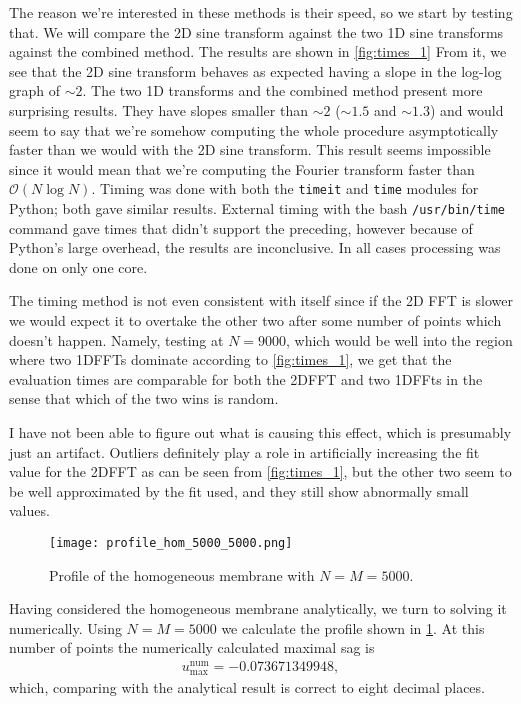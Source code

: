 \documentclass[10pt,a4paper,twocolumn]{article}
\begin{document}
The reason we're interested in these methods is their speed, so we start by testing that. We will compare the 2D sine transform against the two 1D sine transforms against the combined method. The results are shown in \cref{fig:times_1} From it, we see that the 2D sine transform behaves as expected having a slope in the log-log graph of $\sim\!2$. The two 1D transforms and the combined method present more surprising results. They have slopes smaller than $\sim\!2$ ($\sim\!1.5$ and $\sim\!1.3$) and would seem to say that we're somehow computing the whole procedure asymptotically faster than we would with the 2D sine transform. This result seems impossible since it would mean that we're computing the Fourier transform faster than $\mathcal{O}(N \log N)$. Timing was done with both the \texttt{timeit} and \texttt{time} modules for Python; both gave similar results. External timing with the bash \texttt{/usr/bin/time} command gave times that didn't support the preceding, however because of Python's large overhead, the results are inconclusive. In all cases processing was done on only one core.

The timing method is not even consistent with itself since if the 2D FFT is slower we would expect it to overtake the other two after some number of points which doesn't happen. Namely, testing at $N = 9000$, which would be well into the region where two 1DFFTs dominate according to \cref{fig:times_1}, we get that the evaluation times are comparable for both the 2DFFT and two 1DFFts in the sense that which of the two wins is random.

I have not been able to figure out what is causing this effect, which is presumably just an artifact. Outliers definitely play a role in artificially increasing the fit value for the 2DFFT as can be seen from \cref{fig:times_1}, but the other two seem to be well approximated by the fit used, and they still show abnormally small values.

\begin{figure}[!h]
    \centering
    \texttt{[image: profile\_hom\_5000\_5000.png]}
    \caption{Profile of the homogeneous membrane with $N = M = 5000$.}
    \label{fig:profile_hom}
\end{figure}

Having considered the homogeneous membrane analytically, we turn to solving it numerically. Using $N = M = 5000$ we calculate the profile shown in \cref{fig:profile_hom}. At this number of points the numerically calculated maximal sag is 
%
\begin{align}
    u_{\mathrm{max}}^{\mathrm{num}} = -0.073671349948,
\end{align}
%
which, comparing with the analytical result is correct to eight decimal places. 
\end{document}
